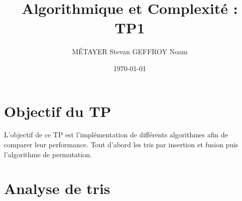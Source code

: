 \documentclass[12pt]{article}
\title{Algorithmique et Complexité : TP1}
\author{MÉTAYER Stevan \break GEFFROY Noam}
\date{\today}
\begin{document}


\newpage

\renewcommand*\contentsname{Sommaire}
\setcounter{tocdepth}{3}
\tableofcontents

\newpage
\section{Objectif du TP}

L'objectif de ce TP est l'implémentation de différents algorithmes afin de comparer leur performance.
Tout d'abord les tris par insertion et fusion puis l'algorithme de permutation.


\newpage

\section{Analyse de tris}
\end{document}
